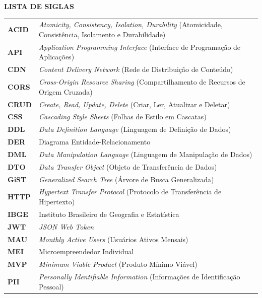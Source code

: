 \documentclass[12pt,a4paper]{article}
\begin{document}
\centering
{\textbf{LISTA DE SIGLAS} \par}
\vspace{0.6cm}
\justifying
\noindent
\begin{tabularx}{\textwidth}{@{}lX@{}}
\textbf{ACID} & \textit{Atomicity, Consistency, Isolation, Durability} (Atomicidade, Consistência, Isolamento e Durabilidade) \\
\textbf{API} & \textit{Application Programming Interface} (Interface de Programação de Aplicações) \\
\textbf{CDN} & \textit{Content Delivery Network} (Rede de Distribuição de Conteúdo) \\
\textbf{CORS} & \textit{Cross-Origin Resource Sharing} (Compartilhamento de Recursos de Origem Cruzada) \\
\textbf{CRUD} & \textit{Create, Read, Update, Delete} (Criar, Ler, Atualizar e Deletar) \\
\textbf{CSS} & \textit{Cascading Style Sheets} (Folhas de Estilo em Cascatas) \\
\textbf{DDL} & \textit{Data Definition Language} (Linguagem de Definição de Dados) \\
\textbf{DER} & Diagrama Entidade-Relacionamento \\
\textbf{DML} & \textit{Data Manipulation Language} (Linguagem de Manipulação de Dados) \\
\textbf{DTO} & \textit{Data Transfer Object} (Objeto de Transferência de Dados) \\
\textbf{GiST} & \textit{Generalized Search Tree} (Árvore de Busca Generalizada) \\
\textbf{HTTP} & \textit{Hypertext Transfer Protocol} (Protocolo de Transferência de Hipertexto) \\
\textbf{IBGE} & Instituto Brasileiro de Geografia e Estatística \\
\textbf{JWT} & \textit{JSON Web Token} \\
\textbf{MAU} & \textit{Monthly Active Users} (Usuários Ativos Mensais) \\
\textbf{MEI} & Microempreendedor Individual \\
\textbf{MVP} & \textit{Minimum Viable Product} (Produto Mínimo Viável) \\
\textbf{PII} & \textit{Personally Identifiable Information} (Informações de Identificação Pessoal) \\

\end{tabularx}
\end{document}
